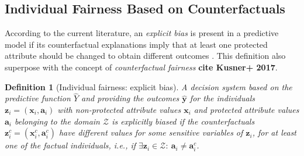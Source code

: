 \documentclass[letterpaper]{article} %
\newtheorem{definition}{Definition}
\DeclareMathOperator*{\argmin}{arg\,min}
\begin{document}

%
%


\subsection{Individual Fairness Based on Counterfactuals}


According to the current literature, an \emph{explicit bias} is present in a predictive model if its counterfactual explanations imply that at least one protected attribute should be changed to obtain different outcomes \cite{sokol2022fat}. This definition also superpose with the concept of \emph{counterfactual fairness} \textbf{cite Kusner+ 2017}.

\begin{definition}[Individual fairness: explicit bias]\label{explicit_bias}
	A decision system based on the predictive function $\hat{Y}$ and providing the outcomes $\boldsymbol{\hat{y}}$ for the individuals $\boldsymbol{z}_i = (\boldsymbol{x}_i, \boldsymbol{a}_i)$ with non-protected attribute values $\boldsymbol{x}_{i}$ and protected attribute values $\boldsymbol{a}_{i}$ belonging to the domain $\mathcal{Z}$ is \emph{explicitly biased} if the counterfactuals $\boldsymbol{z}_i^c = (\boldsymbol{x}_i^c, \boldsymbol{a}_i^c)$ have different values for some sensitive variables of $\boldsymbol{z}_i$, for at least one of the factual individuals, i.e., if $\exists \boldsymbol{z}_i \in \mathcal{Z} : ~ \boldsymbol{a}_{i} \neq \boldsymbol{a}_{i}^{c}$.
\end{definition}
\end{document}
